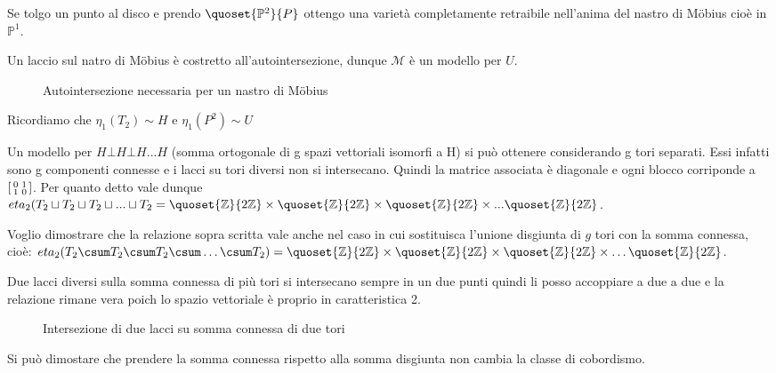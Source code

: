 Se tolgo un punto al disco e prendo $\quoset{\mathbb P^2}{P}$ ottengo una varietà completamente retraibile nell'anima del nastro di Möbius cioè in $\mathbb{P}^1$.

Un laccio sul natro di Möbius è costretto all'autointersezione, dunque $\mathcal{M}$ è un modello per $U$.

\begin{figure}
	\centering 
	
	\caption{Autointersezione necessaria per un nastro di Möbius}
\end{figure}

Ricordiamo che $\eta_1(T_{2}) \sim H$ e $\eta_1(P^{2}) \sim U$


Un modello per $H \bot H \bot H ... H$ (somma ortogonale di g spazi vettoriali isomorfi a H) si può ottenere considerando g tori separati. Essi infatti sono g componenti connesse e i lacci su tori diversi non si intersecano. Quindi la matrice associata è diagonale e ogni blocco corriponde a $\begin{bsmallmatrix} 0 & 1 \\ 1 & 0 \end{bsmallmatrix}$.
Per quanto detto vale dunque $eta_{2}(T_{2} \sqcup T_{2} \sqcup T_{2} \sqcup ... \sqcup T_{2} = \quoset{\mathbb{Z}}{2\mathbb{Z}} \times \quoset{\mathbb{Z}}{2\mathbb{Z}} \times \quoset{\mathbb{Z}}{2\mathbb{Z}} \times ... \quoset{\mathbb{Z}}{2\mathbb{Z}}$.

Voglio dimostrare che la relazione sopra scritta vale anche nel caso in cui sostituisca l'unione disgiunta di $g$ tori con la somma connessa, cioè: $eta_{2}(T_{2} \csum T_{2} \csum T_{2} \csum \dots \csum T_{2}) = \quoset{\mathbb{Z}}{2\mathbb{Z}} \times \quoset{\mathbb{Z}}{2\mathbb{Z}} \times \quoset{\mathbb{Z}}{2\mathbb{Z}} \times \dots \quoset{\mathbb{Z}}{2\mathbb{Z}}$.

Due lacci diversi sulla somma connessa di più tori si intersecano sempre in un due punti quindi li posso accoppiare a due a due e la relazione rimane vera poich lo spazio vettoriale è proprio in caratteristica 2.

\begin{figure}
	\centering 
	
	\caption{Intersezione di due lacci su somma connessa di due tori}
\end{figure}

Si può dimostare che prendere la somma connessa rispetto alla somma disgiunta non cambia la classe di cobordismo. 


